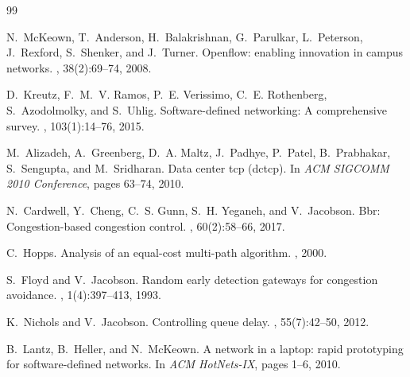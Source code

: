 \documentclass[11pt,a4paper,oneside]{report}
\begin{document}
\appendix



\begin{thebibliography}{99}

N.~McKeown, T.~Anderson, H.~Balakrishnan, G.~Parulkar, L.~Peterson, J.~Rexford, S.~Shenker, and J.~Turner.
\newblock Openflow: enabling innovation in campus networks.
, 38(2):69--74, 2008.

D.~Kreutz, F.~M.~V. Ramos, P.~E. Verissimo, C.~E. Rothenberg, S.~Azodolmolky, and S.~Uhlig.
\newblock Software-defined networking: A comprehensive survey.
, 103(1):14--76, 2015.

M.~Alizadeh, A.~Greenberg, D.~A. Maltz, J.~Padhye, P.~Patel, B.~Prabhakar, S.~Sengupta, and M.~Sridharan.
\newblock Data center tcp (dctcp).
\newblock In {\em ACM SIGCOMM 2010 Conference}, pages 63--74, 2010.

N.~Cardwell, Y.~Cheng, C.~S. Gunn, S.~H. Yeganeh, and V.~Jacobson.
\newblock Bbr: Congestion-based congestion control.
, 60(2):58--66, 2017.

C.~Hopps.
\newblock Analysis of an equal-cost multi-path algorithm.
, 2000.

S.~Floyd and V.~Jacobson.
\newblock Random early detection gateways for congestion avoidance.
, 1(4):397--413, 1993.

K.~Nichols and V.~Jacobson.
\newblock Controlling queue delay.
, 55(7):42--50, 2012.

B.~Lantz, B.~Heller, and N.~McKeown.
\newblock A network in a laptop: rapid prototyping for software-defined networks.
\newblock In {\em ACM HotNets-IX}, pages 1--6, 2010.


\end{thebibliography}
\end{document}
